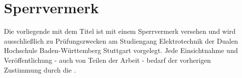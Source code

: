 \chapter*{Sperrvermerk}
\thispagestyle{empty}
Die vorliegende {\projectType} mit dem Titel {\projectTitle}
ist mit einem Sperrvermerk versehen und wird ausschließlich zu Prüfungszwecken
am Studiengang Elektrotechnik der Dualen Hochschule Baden-Württemberg
Stuttgart vorgelegt. Jede Einsichtnahme und Veröffentlichung - auch von
Teilen der Arbeit - bedarf der vorherigen Zustimmung durch die {\company}.
